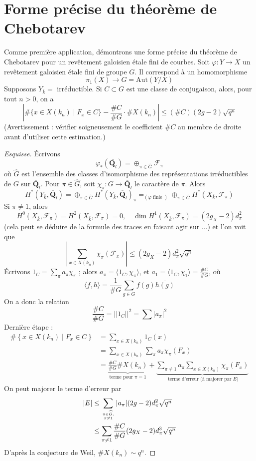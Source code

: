\section{Forme précise du théorème de Chebotarev}
\label{section-chebotarev}

\noindent
Comme première application, démontrons une forme précise du théorème de Chebotarev
pour un revêtement galoisien étale fini de courbes.
Soit $\varphi : Y \to X$ un revêtement galoisien étale fini de
groupe $G$. Il correspond à un homomorphisme
$$
\pi_1(X) \longrightarrow G = \text{Aut}(Y/X)
$$
Supposons $Y_{\overline{k}} = $ irréductible. Si $C\subset G$ est une classe de conjugaison,
alors, pour tout $n > 0$, on a
$$
| \# \{x \in X(k_n) \mid F_x \in C\} - \frac{\# C}{\# G} \cdot \# X(k_n) |
\leq
(\# C)(2g - 2) \sqrt{q^n}
$$
(Avertissement : vérifier soigneusement le coefficient $\# C$ au membre de droite
avant d'utiliser cette estimation.)

\begin{proof}[Esquisse]
Écrivons
$$
\varphi_*(\overline{\mathbf{Q}_l}) =
\oplus_{\pi \in \widehat{G}} \mathcal{F}_{\pi}
$$
où $\widehat{G}$ est l'ensemble des classes d'isomorphisme
des représentations irréductibles de
$G$ sur $\overline{\mathbf{Q}}_l$. Pour $\pi \in \widehat{G}$,
soit $\chi_{\pi}: G \to \overline{\mathbf{Q}}_l$
le caractère de $\pi$. Alors
$$
H^*(Y_{\overline{k}}, \overline{\mathbf{Q}}_l) =
\oplus_{\pi\in \widehat{G}}
H^*(Y_{\overline{k}}, \overline{\mathbf{Q}}_l)_\pi
=_{(\varphi\text{ finie })}
\oplus_{\pi\in \widehat{G}}
H^*(X_{\overline{k}}, \mathcal{F}_\pi)
$$
Si $\pi\neq 1$, alors
$$
H^0(X_{\overline{k}}, \mathcal{F}_\pi) =
H^2(X_{\overline{k}}, \mathcal{F}_\pi) = 0,\quad
\dim H^1(X_{\overline{k}}, \mathcal{F}_\pi) = (2g_X - 2)d_\pi^2
$$
(cela peut se déduire de la formule des traces en faisant agir sur ...) et l'on voit que
$$
|\sum_{x \in X(k_n)} \chi_\pi(\mathcal{F}_x)| \leq
(2g_X - 2) d_\pi^2\sqrt{q^n}
$$
Écrivons $1_C = \sum_\pi a_\pi \chi_\pi$ ; alors
$a_\pi = \langle 1_C, \chi_\pi\rangle$, et
$a_1 = \langle 1_C, \chi_1\rangle = \frac{\# C}{\# G}$, où
$$
\langle f, h\rangle = \frac{1}{\# G}\sum_{g \in G} f(g)\overline{h(g)}
$$
On a donc la relation
$$
\frac{\# C}{\# G} = ||1_C||^2 = \sum|a_\pi|^2
$$
Dernière étape :
\begin{align*}
\#\left\{x \in X(k_n) \mid F_x \in C\right\}
& =
\sum_{x \in X(k_n)} 1_C(x) \\
& =
\sum_{x \in X(k_n)} \sum_\pi a_\pi \chi_\pi(F_x) \\
& =
\underbrace{\frac{\# C}{\# G} \# X(k_n)}_{
\text{terme pour }\pi = 1}
+
\underbrace{\sum_{\pi\neq 1}a_\pi\sum_{x\in X(k_n)}\chi_\pi(F_x)}_{
\text{ terme d'erreur (à majorer par }E)}
\end{align*}
On peut majorer le terme d'erreur par
\begin{align*}
|E|
& \leq
\sum_{\pi \in \widehat{G}, \atop \pi \neq 1}
|a_\pi| (2g - 2) d_\pi^2 \sqrt{q^n} \\
& \leq
\sum_{\pi \neq 1} \frac{\# C}{\# G} (2g_X - 2) d_\pi^3 \sqrt{q^n}
\end{align*}
D'après la conjecture de Weil, $\# X(k_n)\sim q^n$.
\end{proof}



